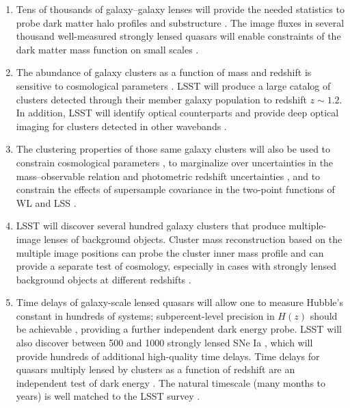 \begin{enumerate}
\item Tens of thousands of galaxy--galaxy lenses will provide the needed statistics to probe dark matter
halo profiles and substructure \cite[e.g.,][]{2006MNRAS.368..715M,2012Natur.481..341V}. The image fluxes in several thousand well-measured
strongly lensed quasars will enable constraints of the dark matter mass function on small scales \citep{2002ApJ...572...25D}.

\item The abundance of galaxy clusters as a function of mass and redshift is sensitive to cosmological parameters
\citep[SciBook, Chap.~13;][]{2014MNRAS.443.1973V}. LSST will produce a large catalog of clusters detected through their member galaxy population
to redshift $z\sim 1.2$.  In addition, LSST will identify optical counterparts and provide deep optical
imaging for clusters detected in other wavebands \citep[e.g.,][]{2009ApJ...701...32S}.

\item The clustering properties of those same galaxy clusters will also be used to constrain
  cosmological parameters \citep{1996MNRAS.282.1096M,2013MNRAS.434..684M}, to marginalize over uncertainties in
  the mass--observable relation and photometric redshift uncertainties \citep{2011PhRvD..83b3008O}, and to constrain the effects of supersample covariance in the two-point functions of WL and LSS \citep{2003ApJ...584..702H,2014MNRAS.441.2456T}.

\item LSST will discover several hundred galaxy clusters that produce multiple-image lenses of background objects.
Cluster mass reconstruction based on the multiple image positions
 can probe the cluster inner mass profile and can provide a separate test of cosmology, especially
in cases with strongly lensed background objects at different redshifts \citep{2000ApJ...532..679P,2003MNRAS.338L..25O}.

\item Time delays of galaxy-scale lensed quasars will allow one to measure Hubble's constant
\citep[e.g.,][]{2010ApJ...711..201S,2017MNRAS.465.4914B} in hundreds of systems; subpercent-level precision in
$H(z)$ should be achievable \citep{2009ApJ...706...45C,2016A&ARv..24...11T}, providing a further independent dark energy probe.
LSST will also discover between 500 and 1000 strongly lensed SNe Ia \citep{2017ApJ...834L...5G,2018ApJ...855...22G}, which will provide hundreds of additional high-quality time delays.
Time delays for quasars multiply lensed by clusters as a function of redshift are an independent test
of dark energy \citep{1997ApJ...482...75K}. The natural timescale (many months to years) is well matched
to the LSST survey \citep{2010MNRAS.405.2579O}.


\end{enumerate}
